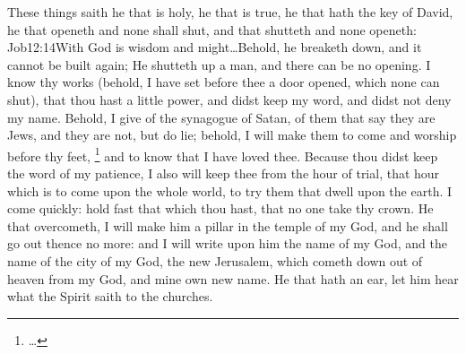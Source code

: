 These things saith he that is holy, he that is true, he that hath the key of David, he that openeth and none shall shut, and that shutteth and none openeth:%
				{Job}{12:14}{With God is wisdom and might\ldots Behold, he breaketh down, and it cannot be built again; He shutteth up a man, and there can be no opening.}
 I know thy works (behold, I have set before thee a door opened, which none can shut), that thou hast a little power, and didst keep my word, and didst not deny my name.   Behold, I give of the synagogue of Satan, of them that say they are Jews, and they are not, but do lie; behold, I will make them to come and worship before thy feet,%
	\footnote{\ldots%
				}
 and to know that I have loved thee. %
 Because thou didst keep the word of my patience, I also will keep thee from the hour of trial, that hour which is to come upon the whole world, to try them that dwell upon the earth. %
 I come quickly: hold fast that which thou hast, that no one take thy crown. %
 He that overcometh, I will make him a pillar in the temple of my God, and he shall go out thence no more: and I will write upon him the name of my God, and the name of the city of my God,%
 the new Jerusalem, which cometh down out of heaven from my God, and mine own new name. %
 He that hath an ear, let him hear what the Spirit saith to the churches.
